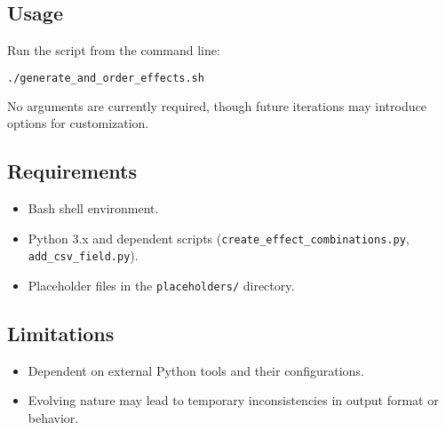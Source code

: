 \subsection{Usage}
Run the script from the command line:
\begin{lstlisting}[language=bash]
./generate_and_order_effects.sh
\end{lstlisting}
No arguments are currently required, though future iterations may introduce options for customization.

\subsection{Requirements}
\begin{itemize}
    \item Bash shell environment.
    \item Python 3.x and dependent scripts (\texttt{create\_effect\_combinations.py}, \texttt{add\_csv\_field.py}).
    \item Placeholder files in the \texttt{placeholders/} directory.
\end{itemize}

\subsection{Limitations}
\begin{itemize}
    \item Dependent on external Python tools and their configurations.
    \item Evolving nature may lead to temporary inconsistencies in output format or behavior.
\end{itemize}
